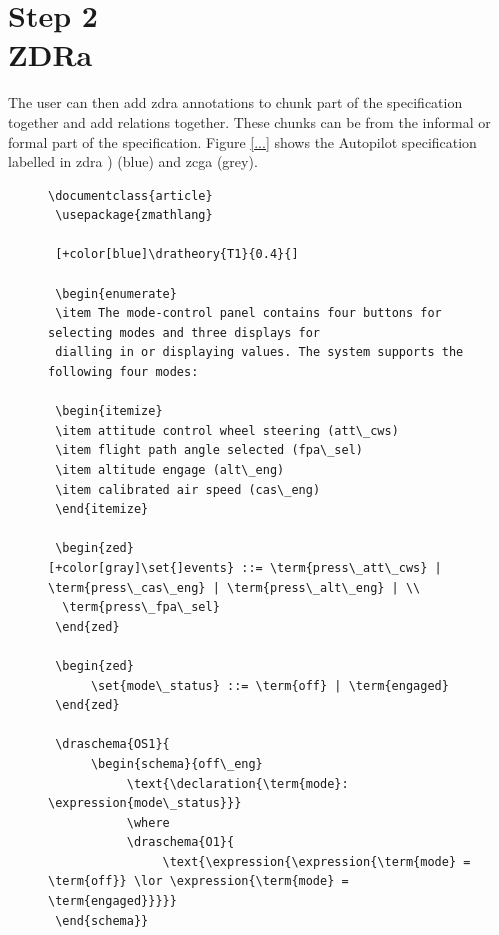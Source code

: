  \section{Step 2\\ZDRa}

 The user can then add \gls{zdra} annotations to chunk part of the specification
together and add relations together. These chunks can be from the informal or
formal part of the specification. Figure \ref{...} shows the Autopilot
specification labelled in \gls{zdra} ) (blue) and \gls{zcga} (grey).

 \begin{figure}[H]
 \vspace{-0.2in}
 \centering
 \begin{minipage}{0.45\textwidth}
 \centering
 \begin{tiny}
 \begin{BVerbatim}[commandchars=+\[\]]
 \documentclass{article}
 \usepackage{zmathlang}
 
 [+color[blue]\dratheory{T1}{0.4}{]
 
 \begin{enumerate}
 \item The mode-control panel contains four buttons for selecting modes and three displays for
 dialling in or displaying values. The system supports the following four modes:
 
 \begin{itemize}
 \item attitude control wheel steering (att\_cws)
 \item flight path angle selected (fpa\_sel)
 \item altitude engage (alt\_eng)
 \item calibrated air speed (cas\_eng)
 \end{itemize}
 
 \begin{zed}
[+color[gray]\set{]events} ::= \term{press\_att\_cws} |  \term{press\_cas\_eng} | \term{press\_alt\_eng} | \\
  \term{press\_fpa\_sel}
 \end{zed}
 
 \begin{zed}
      \set{mode\_status} ::= \term{off} | \term{engaged}
 \end{zed}
 
 \draschema{OS1}{
      \begin{schema}{off\_eng}
           \text{\declaration{\term{mode}: \expression{mode\_status}}}
           \where
           \draschema{O1}{
                \text{\expression{\expression{\term{mode} = \term{off}} \lor \expression{\term{mode} = \term{engaged}}}}}
 \end{schema}}
 

\end{BVerbatim}
\end{tiny}
\end{minipage}
\end{figure}
